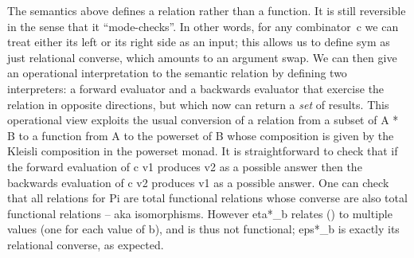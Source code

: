\documentclass{llncs}
\newcommand{\roshan}[1]{}
\begin{document}
The semantics above defines a relation rather than a function. It is still
reversible in the sense that it ``mode-checks''. In other words, for any
combinator~{{c}} we can treat either its left or its right side as an input;
this allows us to define {{sym}} as just relational converse, which amounts
to an argument swap. We can then give an operational interpretation to the
semantic relation by defining two interpreters: a forward evaluator and a
backwards evaluator that exercise the relation in opposite directions, but
which now can return a \emph{set} of results. This operational view exploits
the usual conversion of a relation from a subset of {{A * B}} to a function
from {{A}} to the powerset of {{B}} whose composition is given by the Kleisli
composition in the powerset monad. It is straightforward to check that if the
forward evaluation of {{c v1}} produces {{v2}} as a possible answer then the
backwards evaluation of {{c v2}} produces {{v1}} as a possible answer.  One
can check that all relations for {{Pi}} are total functional relations whose
converse are also total functional relations -- aka isomorphisms.  However
{{eta*_b}} relates {{()}} to multiple values (one for each value of {{b}}),
and is thus not functional; {{eps*_b}} is exactly its relational converse, as
expected.





\end{document}
